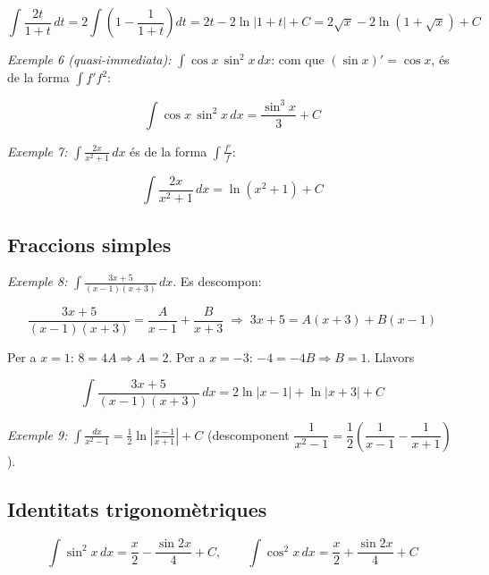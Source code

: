\begin{equation*}
\int\frac{2t}{1+t}\,dt=2\int\left(1-\frac{1}{1+t}\right)dt=2t-2\ln|1+t|+C=2\sqrt x-2\ln\left(1+\sqrt x\right)+C
\end{equation*}

\emph{Exemple 6 (quasi-immediata):} $\displaystyle\int\cos x\,\sin^2x\,dx$: com que $(\sin x)'=\cos x$, és de la forma $\int f'f^2$:

\begin{equation*}
\int\cos x\,\sin^2x\,dx=\frac{\sin^3x}{3}+C
\end{equation*}

\emph{Exemple 7:} $\displaystyle\int\frac{2x}{x^2+1}\,dx$ és de la forma $\int\frac{f'}{f}$:

\begin{equation*}
\int\frac{2x}{x^2+1}\,dx=\ln\left(x^2+1\right)+C
\end{equation*}

\subsection{Fraccions simples}

\emph{Exemple 8:} $\displaystyle\int\frac{3x+5}{(x-1)(x+3)}\,dx$. Es descompon:

\begin{equation*}
\frac{3x+5}{(x-1)(x+3)}=\frac{A}{x-1}+\frac{B}{x+3}\;\Rightarrow\;3x+5=A(x+3)+B(x-1)
\end{equation*}

Per a $x=1$: $8=4A\Rightarrow A=2$. Per a $x=-3$: $-4=-4B\Rightarrow B=1$. Llavors

\begin{equation*}
\int\frac{3x+5}{(x-1)(x+3)}\,dx=2\ln|x-1|+\ln|x+3|+C
\end{equation*}

\emph{Exemple 9:} $\displaystyle\int\frac{dx}{x^2-1}=\frac12\ln\left|\frac{x-1}{x+1}\right|+C$ (descomponent $\dfrac{1}{x^2-1}=\dfrac12\left(\dfrac{1}{x-1}-\dfrac{1}{x+1}\right)$).

\subsection{Identitats trigonomètriques}

\begin{equation*}
\int\sin^2x\,dx=\frac x2-\frac{\sin2x}{4}+C,\qquad \int\cos^2x\,dx=\frac x2+\frac{\sin2x}{4}+C
\end{equation*}

